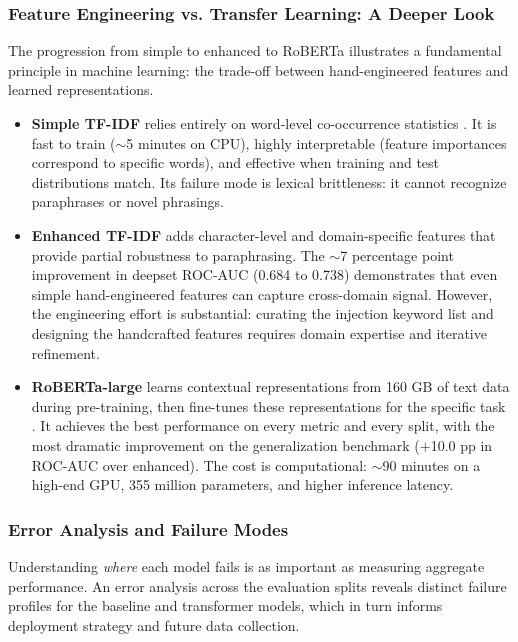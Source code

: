 \documentclass[12pt, letterpaper]{article}   %
\begin{document}
\subsubsection{Feature Engineering vs. Transfer Learning: A Deeper Look}

The progression from simple to enhanced to RoBERTa illustrates a fundamental principle in machine learning: the trade-off between hand-engineered features and learned representations.

\begin{itemize}
    \item \textbf{Simple TF-IDF} relies entirely on word-level co-occurrence statistics \cite{ref1}\cite{ref33}. It is fast to train ($\sim$5 minutes on CPU), highly interpretable (feature importances correspond to specific words), and effective when training and test distributions match. Its failure mode is lexical brittleness: it cannot recognize paraphrases or novel phrasings.

    \item \textbf{Enhanced TF-IDF} adds character-level and domain-specific features that provide partial robustness to paraphrasing. The $\sim$7 percentage point improvement in deepset ROC-AUC (0.684 to 0.738) demonstrates that even simple hand-engineered features can capture cross-domain signal. However, the engineering effort is substantial: curating the injection keyword list and designing the handcrafted features requires domain expertise and iterative refinement.

    \item \textbf{RoBERTa-large} learns contextual representations from 160 GB of text data during pre-training, then fine-tunes these representations for the specific task \cite{ref37}\cite{ref27}. It achieves the best performance on every metric and every split, with the most dramatic improvement on the generalization benchmark ($+$10.0 pp in ROC-AUC over enhanced). The cost is computational: $\sim$90 minutes on a high-end GPU, 355 million parameters, and higher inference latency.
\end{itemize}

\subsubsection{Error Analysis and Failure Modes}

Understanding \textit{where} each model fails is as important as measuring aggregate performance. An error analysis across the evaluation splits reveals distinct failure profiles for the baseline and transformer models, which in turn informs deployment strategy and future data collection.
\end{document}
